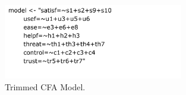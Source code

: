 

\begin{figure}
	\centering
	\includegraphics[width=0.7\textwidth]{figures/cfafinalmodel.png}
	\caption{Trimmed CFA Model.}
	\label{fig:cfafinalmodel}
\end{figure}


